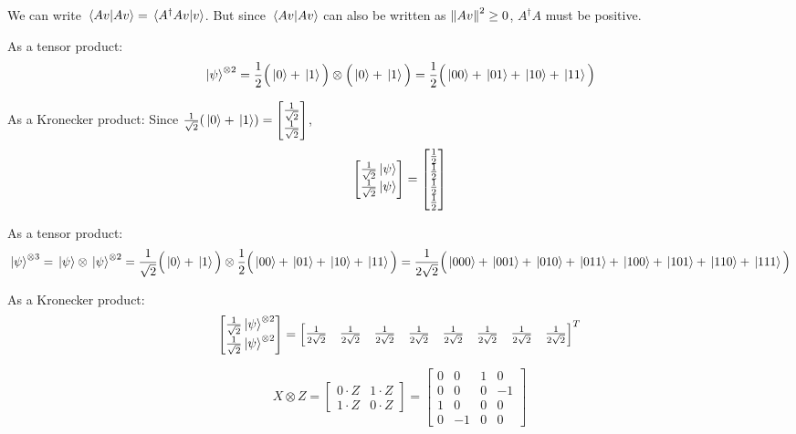 \exercise
We can write $\braket*{Av}{Av} = \braket*{A^{\dagger} A v}{v}$.
But since $\braket*{Av}{Av}$ can also be written as $\norm{Av}^{2} \geq 0$, $A^{\dagger} A$ must be positive. 

\exercise
As a tensor product:
$$\ket*{\psi}^{\otimes 2} = \frac{1}{2} \Big( \ket*{0} + \ket*{1} \Big) \otimes \Big( \ket*{0} + \ket*{1} \Big) = \frac{1}{2} \Big( \ket*{00} + \ket*{01} + \ket*{10} + \ket*{11} \Big)$$ 

As a Kronecker product: 
Since $\frac{1}{\sqrt{2}} ( \ket*{0} + \ket*{1} ) = \begin{bmatrix}
\frac{1}{\sqrt{2}} \\
\frac{1}{\sqrt{2}}
\end{bmatrix}$, 
$$\begin{bmatrix}
\frac{1}{\sqrt{2}} \ket*{\psi} \\
\frac{1}{\sqrt{2}} \ket*{\psi}
\end{bmatrix} = \begin{bmatrix}
\frac{1}{2} \\
\frac{1}{2} \\
\frac{1}{2} \\
\frac{1}{2} 
\end{bmatrix}$$

As a tensor product: 
$$\ket*{\psi}^{\otimes 3} = \ket*{\psi} \otimes \ket*{\psi}^{\otimes 2} = \frac{1}{\sqrt{2}} \Big( \ket*{0} + \ket*{1} \Big) \otimes \frac{1}{2} \Big( \ket*{00} + \ket*{01} + \ket*{10} + \ket*{11} \Big) = \frac{1}{2 \sqrt{2}} \Big( \ket*{000} + \ket*{001} + \ket*{010} + \ket*{011} + \ket*{100} + \ket*{101} + \ket*{110} + \ket*{111} \Big)$$

As a Kronecker product: 
$$\begin{bmatrix}
\frac{1}{\sqrt{2}} \ket*{\psi}^{\otimes 2} \\
\frac{1}{\sqrt{2}} \ket*{\psi}^{\otimes 2}
\end{bmatrix} = \begin{bmatrix}
\frac{1}{2\sqrt{2}} & \frac{1}{2\sqrt{2}} & \frac{1}{2\sqrt{2}} & \frac{1}{2\sqrt{2}} & \frac{1}{2\sqrt{2}} & \frac{1}{2\sqrt{2}} & \frac{1}{2\sqrt{2}} & \frac{1}{2\sqrt{2}} 
\end{bmatrix}^{T}$$

\exercise
$$X \otimes Z = \begin{bmatrix}
0 \cdot Z & 1 \cdot Z \\
1 \cdot Z & 0 \cdot Z
\end{bmatrix} = \begin{bmatrix}
0 & 0 & 1 & 0 \\
0 & 0 & 0 & -1 \\
1 & 0 & 0 & 0 \\
0 & -1 & 0 & 0
\end{bmatrix}$$

